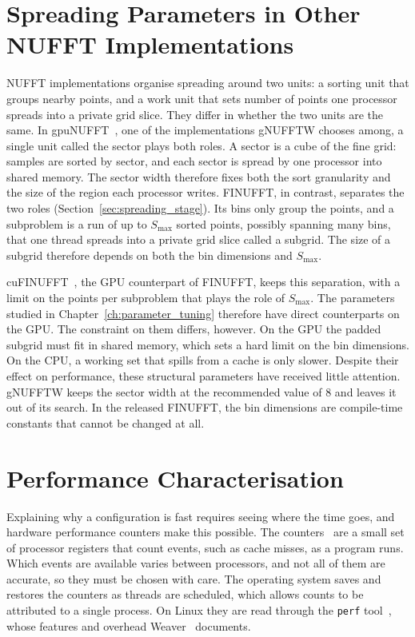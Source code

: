 \section{Spreading Parameters in Other NUFFT Implementations}
\label{sec:related_libraries}

NUFFT implementations organise spreading around two units: a sorting unit that groups nearby points, and a work unit that sets number of points one processor spreads into a private grid slice. They differ in whether the two units are the same. In gpuNUFFT~\cite{knoll2014gpunufft}, one of the implementations gNUFFTW chooses among, a single unit called the sector plays both roles. A sector is a cube of the fine grid: samples are sorted by sector, and each sector is spread by one processor into shared memory. The sector width therefore fixes both the sort granularity and the size of the region each processor writes. FINUFFT, in contrast, separates the two roles (Section~\ref{sec:spreading_stage}). Its bins only group the points, and a subproblem is a run of up to $S_{\max}$ sorted points, possibly spanning many bins, that one thread spreads into a private grid slice called a subgrid. The size of a subgrid therefore depends on both the bin dimensions and $S_{\max}$.

cuFINUFFT~\cite{shih2021}, the GPU counterpart of FINUFFT, keeps this separation, with a limit on the points per subproblem that plays the role of $S_{\max}$. The parameters studied in Chapter~\ref{ch:parameter_tuning} therefore have direct counterparts on the GPU. The constraint on them differs, however. On the GPU the padded subgrid must fit in shared memory, which sets a hard limit on the bin dimensions. On the CPU, a working set that spills from a cache is only slower. Despite their effect on performance, these structural parameters have received little attention. gNUFFTW keeps the sector width at the recommended value of $8$ and leaves it out of its search. In the released FINUFFT, the bin dimensions are compile-time constants that cannot be changed at all.

\section{Performance Characterisation}
\label{sec:related_perf}

Explaining why a configuration is fast requires seeing where the time goes, and hardware performance counters make this possible. The counters~\cite{intelsdm} are a small set of processor registers that count events, such as cache misses, as a program runs. Which events are available varies between processors, and not all of them are accurate, so they must be chosen with care. The operating system saves and restores the counters as threads are scheduled, which allows counts to be attributed to a single process. On Linux they are read through the \texttt{perf} tool~\cite{perf}, whose features and overhead Weaver~\cite{weaver2013} documents.

